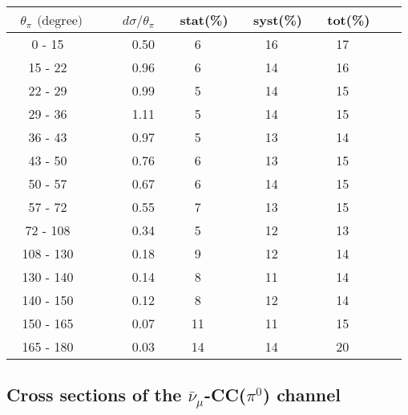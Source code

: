 \documentclass[aps, prd, reprint,showpacs,  preprintnumbers,amsmath,amssymb,superscriptaddress, nofootinbib]{revtex4-1}
\makeatletter
\newcommand{\anumu}{\ensuremath{\bar{\nu}_{\mu}}}
\renewenvironment{table}
  {\def\@captype{table}}
  {}
\makeatother
\begin{document}
\vspace{1cm}

\begin{table}
\centering
\begin{tabular}{crccccc}
\hline
~$\theta_\pi$ $\text{(degree)}$ &~~~ $d\sigma/\theta_\pi$ &~ stat(\%) &~ syst(\%) &~ tot(\%)  \\
\hline
 0 - 15 &   0.50 &    6 &   16 &   17 \\
15 - 22 &   0.96 &    6 &   14 &   16 \\
22 - 29 &   0.99 &    5 &   14 &   15 \\
29 - 36 &   1.11 &    5 &   14 &   15 \\
36 - 43 &   0.97 &    5 &   13 &   14 \\
43 - 50 &   0.76 &    6 &   13 &   15 \\
50 - 57 &   0.67 &    6 &   14 &   15 \\
57 - 72 &   0.55 &    7 &   13 &   15 \\
72 - 108 &   0.34 &    5 &   12 &   13 \\
108 - 130 &   0.18 &    9 &   12 &   14 \\
130 - 140 &   0.14 &    8 &   11 &   14 \\
140 - 150 &   0.12 &    8 &   12 &   14 \\
150 - 165 &   0.07 &   11 &   11 &   15 \\
165 - 180 &   0.03 &   14 &   14 &   20 \\
\hline\hline
\end{tabular}
\caption{ Flux-averaged differential cross section in $\theta_\pi$, 
$d\sigma/d\theta_{\pi} (10^{-40}\text{cm}^2/\text{nucleon}/\text{degree})$, 
for N$\pi^+$ production with statistical (stat), systematic (syst), and total (tot) uncertainties.}
\label{tb:pip_theta}
\end{table}

\subsection{Cross sections of the $\anumu$-CC($\pi^{0}$) channel}
\end{document}
